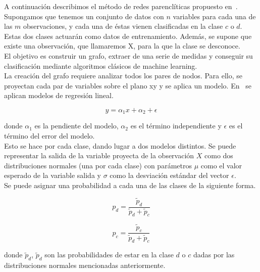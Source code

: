 A continuación describimos el método de redes parenclíticas propuesto en~\cite{metabo3010155}.\\

Supongamos que tenemos un conjunto de datos con $n$ variables para cada una de las $m$ observaciones, y cada una de éstas vienen clasificadas en la clase $c$ o $d$. Estas dos clases actuarán como datos de entrenamiento. Además, se supone que existe una observación, que llamaremos X, para la que la clase se desconoce.\\

El objetivo es construir un grafo, extraer de una serie de medidas y conseguir su clasificación mediante algoritmos clásicos de machine learning.\\

La creación del grafo requiere analizar todos los pares de nodos. Para ello, se proyectan cada par de variables sobre el plano xy y se aplica un modelo. En~\cite{metabo3010155, 1304.1896, Zanin2014} se aplican modelos de regresión lineal.

\begin{equation}
y = \alpha_1 x + \alpha_2 + \epsilon
\end{equation} 

donde $\alpha_1$ es la pendiente del modelo, $\alpha_2$ es el término independiente y $\epsilon$ es el término del error del modelo.\\

Esto se hace por cada clase, dando lugar a dos modelos distintos. Se puede representar la salida de la variable proyecta de la observación $X$ como dos distribuciones normales (una por cada clase) con parámetros $\mu$ como el valor esperado de la variable salida y $\sigma$ como la desviación estándar del vector $\epsilon$.\\

Se puede asignar una probabilidad a cada una de las clases de la siguiente forma.

\begin{equation}\label{eq:prob1}
p_d = \dfrac{\tilde{p}_d}{\tilde{p}_d + \tilde{p}_c}
\end{equation}

\begin{equation}\label{eq:prob2}
p_c = \dfrac{\tilde{p}_c}{\tilde{p}_d + \tilde{p}_c}
\end{equation}

donde $\tilde{p}_d$, $\tilde{p}_d$ son las probabilidades de estar en la clase $d$ o $c$ dadas por las distribuciones normales mencionadas anteriormente.\\

